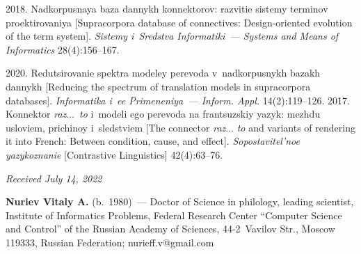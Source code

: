 \begin{multicols}{2}
{{\begin{thebibliography}{99}
     2018. 
Nadkorpusnaya baza dannykh konnektorov: razvitie sistemy terminov 
proektirovaniya [Supracorpora database of connectives: Design-oriented 
evolution of the term system]. \textit{Sistemy i~Sredstva Informatiki~--- 
Systems and Means of Informatics} 28(4):156--167.

     2020. Redutsirovanie 
spektra modeley perevoda v~nadkorpusnykh bazakh dannykh [Reducing 
the spectrum of translation models in supracorpora databases]. 
\textit{Informatika i~ee Primeneniya~--- Inform. Appl.} 14(2):119--126.
     2017. Konnektor \textit{raz}$\ldots$\ \textit{to} i~modeli 
ego perevoda na frantsuzskiy yazyk: mezhdu usloviem, prichinoy 
i~sledstviem [The connector \textit{raz}$\ldots$ \textit{to} and variants of rendering it 
into French: Between condition, cause, and effect]. 
\textit{Sopostavitel'noe yazykoznanie} [Contrastive Linguistics] 
42(4):63--76.
\end{thebibliography}

 }
 }

\end{multicols}

\vspace*{-6pt}

\hfill{\small\textit{Received July 14, 2022}}
    
    \Contrl
    
    \noindent
    \textbf{Nuriev Vitaly A.} (b.\ 1980)~--- Doctor of Science in 
philology, leading scientist, Institute of Informatics Problems, Federal 
Research Center ``Computer Science and Control'' of the Russian 
Academy of Sciences, 44-2~Vavilov Str., Moscow 119333, Russian 
Federation; \mbox{nurieff.v@gmail.com}
    

\label{end\stat}

\renewcommand{\bibname}{\protect\rm Литература}    
